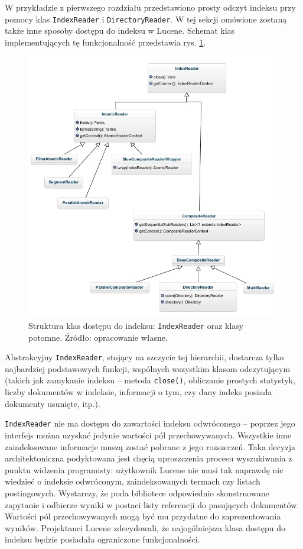 W przykładzie z pierwszego rozdziału przedstawiono prosty odczyt indeksu przy pomocy klas \texttt{IndexReader} i \texttt{DirectoryReader}. W tej sekcji omówione zostaną także inne sposoby dostępu do indeksu w Lucene. Schemat klas implementujących tę funkcjonalność przedstawia rys. \ref{fig:indexReader}. 

\begin{figure}[here]
 \centering
 \includegraphics[scale=0.54]{pictures/Readers_1.jpg}
 \caption{Struktura klas dostępu do indeksu: \texttt{IndexReader} oraz klasy potomne. Źródło: opracowanie własne. \label{fig:indexReader}}
\end{figure}

Abstrakcyjny \texttt{IndexReader}, stojący na szczycie tej hierarchii, dostarcza tylko najbardziej podstawowych funkcji, wspólnych wszystkim klasom odczytującym (takich jak zamykanie indeksu -- metoda \texttt{close()}, obliczanie prostych statystyk, liczby dokumentów w indeksie, informacji o tym, czy dany indeks posiada dokumenty usunięte, itp.). 

\texttt{IndexReader} nie ma dostępu do zawartości indeksu odwróconego -- poprzez jego interfejs można uzyskać jedynie wartości pól przechowywanych. Wszystkie inne zaindeksowane informacje muszą zostać pobrane z jego rozszerzeń. Taka decyzja architektoniczna podyktowana jest chęcią uproszczenia procesu wyszukiwania z punktu widzenia programisty: użytkownik Lucene nie musi tak naprawdę nic wiedzieć o indeksie odwróconym, zaindeksowanych termach czy listach postingowych. Wystarczy, że poda bibliotece odpowiednio skonstruowane zapytanie i odbierze wyniki w postaci listy referencji do pasujących dokumentów. Wartości pól przechowywanych mogą być mu przydatne do zaprezentowania wyników. Projektanci Lucene zdecydowali, że najogólniejsza klasa dostępu do indeksu będzie posiadała ograniczone funkcjonalności.

